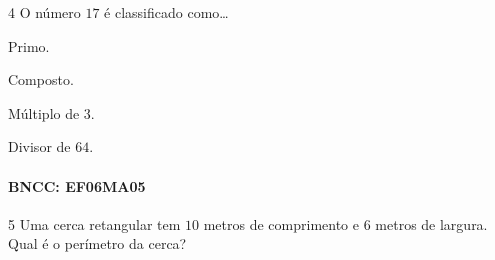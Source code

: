 
\num{4}  O número $17$ é classificado como\ldots{}

\begin{escolha}
\item
  Primo.
\item
  Composto.
\item
  Múltiplo de $3$.
\item
  Divisor de $64$.
\end{escolha}

\paragraph{BNCC: EF06MA05 }



\num{5}  Uma cerca retangular tem $10$ metros de comprimento e $6$ metros de
largura. Qual é o perímetro da cerca?

